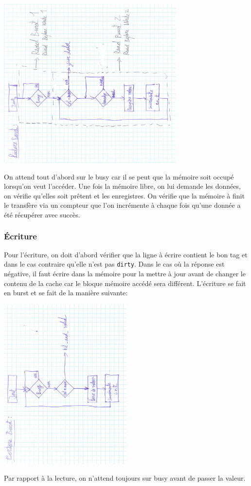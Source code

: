 \documentclass[10pt,a4paper]{article}
\begin{document}
\begin{center}

\includegraphics[width=0.7\textwidth, angle=-90]{images/mss_read}

\end{center}

On attend tout d'abord sur le busy car il se peut que la mémoire soit occupé lorsqu'on veut l’accéder. Une fois la mémoire libre, on lui demande les données, on vérifie qu'elles soit prêtent et les enregistres. On vérifie que la mémoire à finit le transfère via un compteur que l'on incrémente à chaque fois qu'une donnée a été récupérer avec succès.

\subsubsection{Écriture}
Pour l'écriture, on doit d'abord vérifier que la ligne à écrire contient le bon tag et dans le cas contraire qu'elle n'est pas \texttt{dirty}. Dans le cas où la réponse est négative, il faut écrire dans la mémoire pour la mettre à jour avant de changer le contenu de la cache car le bloque mémoire accédé sera différent.
L'écriture se fait en burst et se fait de la manière suivante:  
\begin{center}

\includegraphics[width=0.5\textwidth, angle=-90]{images/mss_write}

\end{center}
Par rapport à la lecture, on n'attend toujours sur busy avant de passer la valeur.\\
\end{document}
